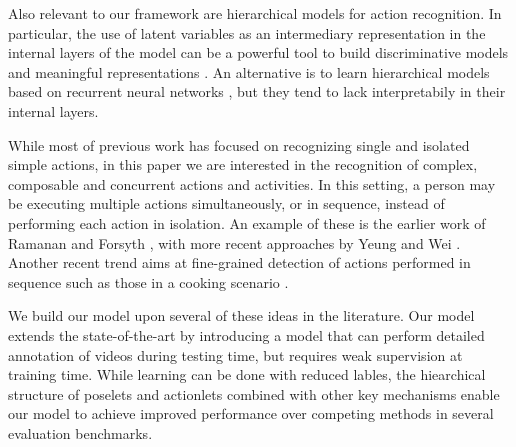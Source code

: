 Also relevant to our framework are hierarchical models for action
recognition. In particular, the use of latent variables as an intermediary
representation in the internal layers of the model can be a powerful
tool to build discriminative models and meaningful representations
\cite{Hu2014, Wang2008}. An alternative is to learn hierarchical models
based on recurrent neural networks \cite{YongDu2015}, but they tend to lack
interpretabily in their internal layers.


While most of previous work has focused on recognizing single and isolated
simple actions, in this paper we are interested in the recognition
of complex, composable \cite{Lillo2014} and concurrent \cite{Wei2013} actions
and activities. In this setting, a person may be executing multiple actions
simultaneously, or in sequence, instead of performing each action in isolation.
An example of these is the earlier work of Ramanan and Forsyth \cite{Ramanan2003},
with more recent approaches by Yeung \etal \cite{Yeung2015} and
Wei \etal \cite{Wei2013}.
Another recent trend aims at fine-grained detection of actions performed in sequence
such as those in a cooking scenario \cite{Rohrbach2012, Lan2015}.

We build our model upon several of these ideas in the literature. Our model
extends the state-of-the-art by introducing a model that can perform
detailed annotation of videos during testing time, but requires weak
supervision at training time. While learning can be done with
reduced lables, the hiearchical structure of poselets and actionlets combined
with other key mechanisms enable our model to achieve improved
performance over competing methods in several evaluation benchmarks.
